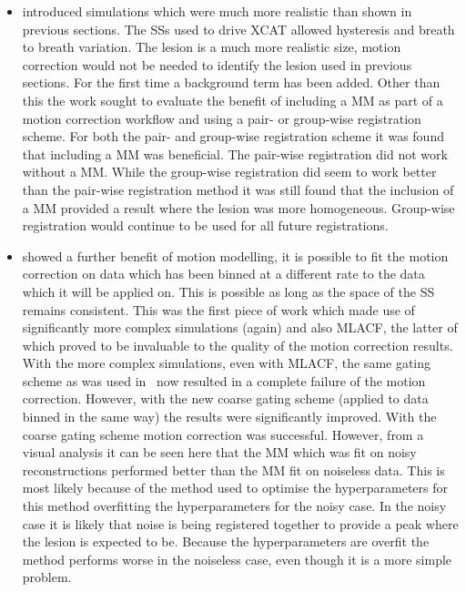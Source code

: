 \begin{itemize}
            \item {} introduced simulations which were much more realistic than shown in previous sections. The \glspl{SS} used to drive \gls{XCAT} allowed hysteresis and breath to breath variation. The lesion is a much more realistic size, motion correction would not be needed to identify the lesion used in previous sections. For the first time a background term has been added. Other than this the work sought to evaluate the benefit of including a \gls{MM} as part of a motion correction workflow and using a pair- or group-wise registration scheme. For both the pair- and group-wise registration scheme it was found that including a \gls{MM} was beneficial. The pair-wise registration did not work without a \gls{MM}. While the group-wise registration did seem to work better than the pair-wise registration method it was still found that the inclusion of a \gls{MM} provided a result where the lesion was more homogeneous. Group-wise registration would continue to be used for all future registrations.

            \item {} showed a further benefit of motion modelling, it is possible to fit the motion correction on data which has been binned at a different rate to the data which it will be applied on. This is possible as long as the space of the \gls{SS} remains consistent. This was the first piece of work which made use of significantly more complex simulations (again) and also \gls{MLACF}, the latter of which proved to be invaluable to the quality of the motion correction results. With the more complex simulations, even with \gls{MLACF}, the same gating scheme as was used in~ now resulted in a complete failure of the motion correction. However, with the new coarse gating scheme (applied to data binned in the same way) the results were significantly improved. With the coarse gating scheme motion correction was successful. However, from a visual analysis it can be seen here that the \gls{MM} which was fit on noisy reconstructions performed better than the \gls{MM} fit on noiseless data. This is most likely because of the method used to optimise the hyperparameters for this method overfitting the hyperparameters for the noisy case. In the noisy case it is likely that noise is being registered together to provide a peak where the lesion is expected to be. Because the hyperparameters are overfit the method performs worse in the noiseless case, even though it is a more simple problem.


\end{itemize}
